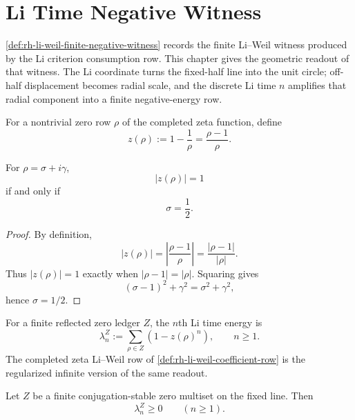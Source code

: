 \chapter{Li Time Negative Witness}
\label{ch:visions-rh-li-time-negative-witness}

\autoref{def:rh-li-weil-finite-negative-witness} records the finite
Li--Weil witness produced by the Li criterion consumption row.  This
chapter gives the geometric readout of that witness.  The Li coordinate
turns the fixed-half line into the unit circle; off-half displacement
becomes radial scale, and the discrete Li time $n$ amplifies that radial
component into a finite negative-energy row.

\begin{definition}
\label{def:rh-li-time-coordinate}
For a nontrivial zero row $\rho$ of the completed zeta function, define
$$
z(\rho):=1-\frac{1}{\rho}
=
\frac{\rho-1}{\rho}.
$$
\end{definition}

\begin{theorem}
\label{thm:rh-li-coordinate-fixed-half-circle}
For $\rho=\sigma+i\gamma$,
$$
|z(\rho)|=1
$$
if and only if
$$
\sigma=\frac12.
$$
\end{theorem}

\begin{proof}
By definition,
$$
|z(\rho)|
=
\left|\frac{\rho-1}{\rho}\right|
=
\frac{|\rho-1|}{|\rho|}.
$$
Thus $|z(\rho)|=1$ exactly when $|\rho-1|=|\rho|$.  Squaring gives
$$
(\sigma-1)^2+\gamma^2=\sigma^2+\gamma^2,
$$
hence $\sigma=1/2$.
\end{proof}

\begin{definition}
\label{def:rh-li-discrete-time-energy}
For a finite reflected zero ledger $Z$, the $n$th Li time energy is
$$
\lambda_n^Z
:=
\sum_{\rho\in Z}
\left(1-z(\rho)^n\right),
\qquad
n\ge1.
$$
The completed zeta Li--Weil row of
\autoref{def:rh-li-weil-coefficient-row} is the regularized infinite
version of the same readout.
\end{definition}

\begin{theorem}
\label{thm:rh-fixed-line-pairs-nonnegative-li-time-energy}
Let $Z$ be a finite conjugation-stable zero multiset on the fixed line.
Then
$$
\lambda_n^Z\ge0
\qquad
(n\ge1).
$$
\end{theorem}

